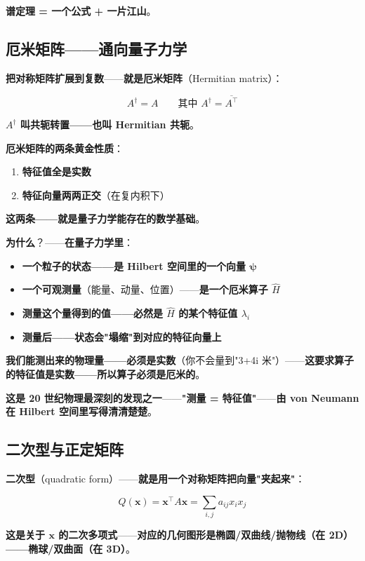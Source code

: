 \textbf{谱定理 = 一个公式 + 一片江山}。

\subsection{厄米矩阵——通向量子力学}

\textbf{把对称矩阵扩展到复数}——\textbf{就是厄米矩阵}（Hermitian matrix）：

\[
A^\dagger = A \qquad \text{其中 } A^\dagger = \overline{A^\top}
\]

\textbf{$A^\dagger$ 叫共轭转置——也叫 Hermitian 共轭}。

\textbf{厄米矩阵的两条黄金性质}：

\begin{enumerate}
\item \textbf{特征值全是实数}
\item \textbf{特征向量两两正交}（在复内积下）
\end{enumerate}

\textbf{这两条——就是量子力学能存在的数学基础}。

\textbf{为什么}？——\textbf{在量子力学里}：

\begin{itemize}
\item \textbf{一个粒子的状态——是 Hilbert 空间里的一个向量 $\bm{\psi}$}
\item \textbf{一个可观测量}（能量、动量、位置）——\textbf{是一个厄米算子 $\hat{H}$}
\item \textbf{测量这个量得到的值——必然是 $\hat{H}$ 的某个特征值 $\lambda_i$}
\item \textbf{测量后——状态会"塌缩"到对应的特征向量上}
\end{itemize}

\textbf{我们能测出来的物理量——必须是实数}（你不会量到"3+4i 米"）——\textbf{这要求算子的特征值是实数——所以算子必须是厄米的}。

\textbf{这是 20 世纪物理最深刻的发现之一}——\textbf{"测量 = 特征值"}——\textbf{由 von Neumann 在 Hilbert 空间里写得清清楚楚}。

\subsection{二次型与正定矩阵}

\textbf{二次型}（quadratic form）——\textbf{就是用一个对称矩阵把向量"夹起来"}：

\[
Q(\bm{x}) = \bm{x}^\top A \bm{x} = \sum_{i,j} a_{ij} x_i x_j
\]

\textbf{这是关于 $\bm{x}$ 的二次多项式}——\textbf{对应的几何图形是椭圆/双曲线/抛物线（在 2D）——椭球/双曲面（在 3D）}。

